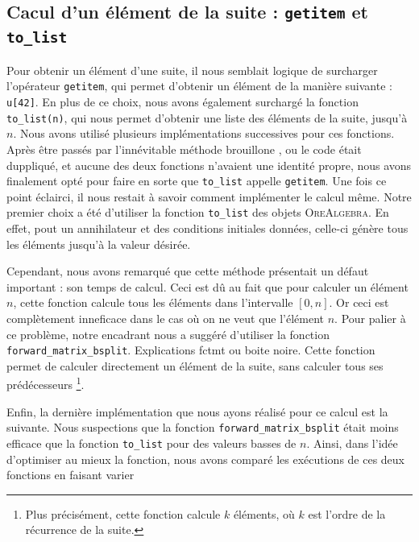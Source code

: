 \documentclass[12pt]{article}
\newlength{\charwidth}
\newcommand{\uline}{\underline{\hspace{2\charwidth}}}
\begin{document}
    \subsection{Cacul d'un élément de la suite : \texttt{\uline getitem\uline } et \texttt{to\_list}}
        \label{sec:getitem}
        Pour obtenir un élément d'une suite, il nous semblait logique de surcharger l'opérateur
        \texttt{\uline getitem\uline }, qui permet d'obtenir un élément de la manière suivante : 
        \texttt{u[42]}. En plus de ce choix, nous avons également surchargé la fonction
        \texttt{to\_list(n)}, qui nous permet d'obtenir une liste des éléments de la suite, jusqu'à $n$.
        Nous avons utilisé plusieurs implémentations successives pour ces fonctions.
        Après être passés par l'innévitable \og méthode brouillone \fg, ou le code était duppliqué,
        et aucune des deux fonctions n'avaient une identité propre, nous avons finalement opté pour
        faire en sorte que \texttt{to\_list} appelle \texttt{\uline getitem\uline}. Une fois ce point
        éclairci, il nous restait à savoir comment implémenter le calcul même. Notre premier choix
        a été d'utiliser la fonction \texttt{to\_list} des objets \textsc{OreAlgebra}. En effet,
        pout un annihilateur et des conditions initiales données, celle-ci génère tous les éléments
        jusqu'à la valeur désirée.
        \par Cependant, nous avons remarqué que cette méthode présentait un défaut important : son
        temps de calcul. Ceci est dû au fait que pour calculer un élément $n$, cette fonction
        calcule tous les éléments dans l'intervalle $[0,n]$. Or ceci est complètement inneficace
        dans le cas où on ne veut que l'élément $n$. Pour palier à ce problème, notre encadrant nous 
        a suggéré d'utiliser la fonction \texttt{forward\_matrix\_bsplit}.
        {\color{red} Explications fctmt ou boite noire.}
        Cette fonction permet de calculer directement un élément de la suite, sans calculer tous ses
        prédécesseurs
        \footnote{Plus précisément, cette fonction calcule $k$ éléments, où  $k$ est l'ordre de la
        récurrence de la suite.}.
        \par Enfin, la dernière implémentation que nous ayons réalisé pour ce calcul est la suivante.
        Nous suspections que la fonction \texttt{forward\_matrix\_bsplit} était moins efficace que la
        fonction \texttt{to\_list} pour des valeurs basses de $n$. Ainsi, dans l'idée d'optimiser au
        mieux la fonction, nous avons comparé les exécutions de ces deux fonctions en faisant varier
\end{document}

